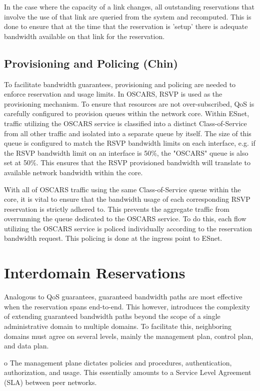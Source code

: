 \documentclass[conference]{IEEEtran}
\begin{document}
In the case where the capacity of a link changes, all outstanding reservations
that involve the use of that link are queried from the system and recomputed.
This is done to ensure that at the time that the reservation is 'setup' there
is adequate bandwidth available on that link for the reservation.

\subsection{Provisioning and Policing (Chin)}
To facilitate bandwidth guarantees, provisioning and policing are needed to 
enforce reservation and usage limits.  In OSCARS, RSVP is used as the 
provisioning mechanism.  To ensure that resources are not over-subscribed, QoS 
is carefully configured to provision queues within the network core.  Within 
ESnet, traffic utilizing the OSCARS service is classified into a distinct 
Class-of-Service from all other traffic and isolated into a separate queue by 
itself.  The size of this queue is configured to match the RSVP bandwidth 
limits on each interface, e.g. if the RSVP bandwidth limit on an interface is 
50\%, the "OSCARS" queue is also set at 50\%.  This ensures that the RSVP 
provisioned bandwidth will translate to available network bandwidth within 
the core.

With all of OSCARS traffic using the same Class-of-Service queue within the 
core, it is vital to ensure that the bandwidth usage of each corresponding 
RSVP reservation is strictly adhered to.  This prevents the aggregate traffic 
from overrunning the queue dedicated to the OSCARS service.  To do this, each 
flow utilizing the OSCARS service is policed individually according to the 
reservation bandwidth request.  This policing is done at the ingress point to 
ESnet.


\section{Interdomain Reservations}

Analogous to QoS guarantees, guaranteed bandwidth paths are most effective 
when the reservation spans end-to-end.  This however, introduces the 
complexity of extending guaranteed bandwidth paths beyond the scope of a 
single administrative domain to multiple domains.  To facilitate this, 
neighboring domains must agree on several levels, mainly the management plan, 
control plan, and data plan.

o The management plane dictates policies and procedures, authentication, 
authorization, and usage.  This essentially amounts to a Service Level 
Agreement (SLA) between peer networks.
\end{document}
